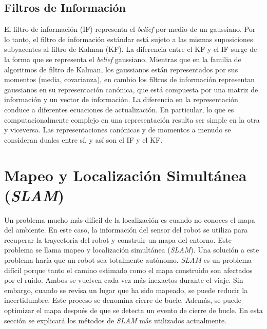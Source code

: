 \subsection{Filtros de Informaci\'on}
El filtro de informaci\'on (IF) representa el \textit{belief} por medio de un 
gaussiano. Por lo tanto, el filtro de informaci\'on est\'andar est\'a sujeto a las 
mismas suposiciones subyacentes al filtro de Kalman (KF). La diferencia entre 
el KF y el IF surge de la forma que se representa el \textit{belief} gaussiano. Mientras 
que en la familia de algoritmos de filtro de Kalman, los gaussianos est\'an 
representados por sus momentos (media, covarianza), en cambio los filtros de 
informaci\'on representan gaussianos en su representaci\'on can\'onica, que 
est\'a compuesta por una matriz de informaci\'on y un vector de 
informaci\'on. La diferencia en la representaci\'on conduce a diferentes ecuaciones
de actualizaci\'on. En particular, lo que es computacionalmente complejo en 
una representaci\'on resulta ser simple en la otra y viceversa. Las 
representaciones can\'onicas y de momentos a menudo se consideran duales 
entre s\'i, y as\'i son el IF y el KF.

\section{Mapeo y Localizaci\'on Simult\'anea (\textit{SLAM})}
Un problema mucho m\'as dif\'icil de la localizaci\'on es cuando no conoces 
el mapa del ambiente. En este caso, la informaci\'on del sensor del robot 
se utiliza para recuperar la trayectoria del robot y construir un mapa 
del entorno. Este problema se llama mapeo y localizaci\'on simult\'anea 
(\textit{SLAM}). Una soluci\'on a este problema har\'ia que un robot 
sea totalmente aut\'onomo. \textit{SLAM} es un problema dif\'icil porque tanto el 
camino estimado como el mapa construido son afectados por el ruido. Ambos 
se vuelven cada vez m\'as inexactos durante el viaje. Sin embargo, cuando 
se revisa un lugar que ha sido mapeado, se puede reducir la incertidumbre.
Este proceso se denomina cierre de bucle. Adem\'as, se puede optimizar el 
mapa despu\'es de que se detecta un evento de cierre de bucle. En esta secci\'on se 
explicar\'a los m\'etodos de \textit{SLAM} m\'as utilizados actualmente.

